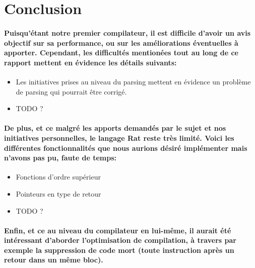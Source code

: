 \documentclass[french]{article}
\begin{document}
\section{Conclusion}
\paragraph{Puisqu'étant notre premier compilateur, il est difficile d'avoir un avis objectif sur sa performance, ou sur les améliorations
éventuelles à apporter. Cependant, les difficultés mentionées tout au long de ce rapport mettent en évidence les détails suivants:\\}
\begin{itemize}
        \item Les initiatives prises au niveau du parsing mettent en évidence un problème de parsing qui pourrait être corrigé.
        \item TODO ?
\end{itemize}
\paragraph{De plus, et ce malgré les apports demandés par le sujet et nos initiatives personnelles, le langage Rat reste très limité. Voici les différentes 
fonctionnalités que nous aurions désiré implémenter mais n'avons pas pu, faute de temps:}
\begin{itemize}
        \item Fonctions d'ordre supérieur
        \item Pointeurs en type de retour
        \item TODO ?
\end{itemize}
\paragraph{Enfin, et ce au niveau du compilateur en lui-même, il aurait été intéressant d'aborder l'optimisation de compilation, à travers par exemple la
suppression de code mort (toute instruction après un retour dans un même bloc).
}
\end{document}
